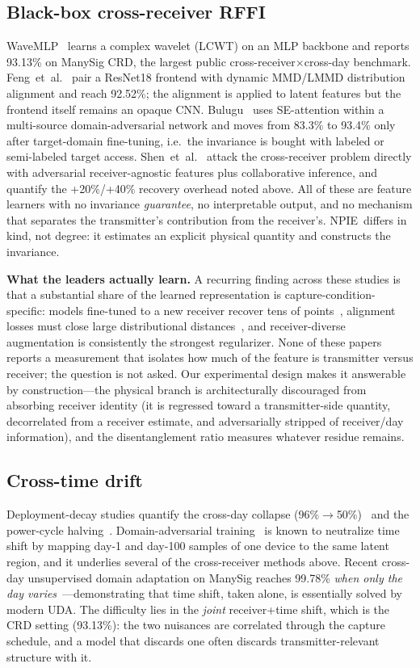 \documentclass[journal]{IEEEtran}
\newcommand{\npie}{\textsc{NPIE}}
\begin{document}
\subsection{Black-box cross-receiver RFFI}
WaveMLP~\cite{wavemlp} learns a complex wavelet (LCWT) on an MLP backbone and reports 93.13\% on ManySig CRD, the largest public cross-receiver$\times$cross-day benchmark. Feng~et~al.~\cite{feng2025} pair a ResNet18 frontend with dynamic MMD/LMMD distribution alignment and reach 92.52\%; the alignment is applied to latent features but the frontend itself remains an opaque CNN. Bulugu~\cite{bulugu2025} uses SE-attention within a multi-source domain-adversarial network and moves from 83.3\% to 93.4\% only after target-domain fine-tuning, i.e.\ the invariance is bought with labeled or semi-labeled target access. Shen~et~al.~\cite{shen2024} attack the cross-receiver problem directly with adversarial receiver-agnostic features plus collaborative inference, and quantify the +20\%/+40\% recovery overhead noted above. All of these are feature learners with no invariance \emph{guarantee}, no interpretable output, and no mechanism that separates the transmitter's contribution from the receiver's. \npie\ differs in kind, not degree: it estimates an explicit physical quantity and constructs the invariance.

\textbf{What the leaders actually learn.} A recurring finding across these studies is that a substantial share of the learned representation is capture-condition-specific: models fine-tuned to a new receiver recover tens of points~\cite{shen2024}, alignment losses must close large distributional distances~\cite{feng2025}, and receiver-diverse augmentation is consistently the strongest regularizer. None of these papers reports a measurement that isolates how much of the feature is transmitter versus receiver; the question is not asked. Our experimental design makes it answerable by construction---the physical branch is architecturally discouraged from absorbing receiver identity (it is regressed toward a transmitter-side quantity, decorrelated from a receiver estimate, and adversarially stripped of receiver/day information), and the disentanglement ratio measures whatever residue remains.

\subsection{Cross-time drift}
Deployment-decay studies quantify the cross-day collapse (96\%$\to$50\%)~\cite{quadar2024} and the power-cycle halving~\cite{alhazbi}. Domain-adversarial training~\cite{ganin2016} is known to neutralize time shift by mapping day-1 and day-100 samples of one device to the same latent region, and it underlies several of the cross-receiver methods above. Recent cross-day unsupervised domain adaptation on ManySig reaches 99.78\% \emph{when only the day varies}~\cite{belfast2026}---demonstrating that time shift, taken alone, is essentially solved by modern UDA. The difficulty lies in the \emph{joint} receiver+time shift, which is the CRD setting (93.13\%): the two nuisances are correlated through the capture schedule, and a model that discards one often discards transmitter-relevant structure with it.
\end{document}
